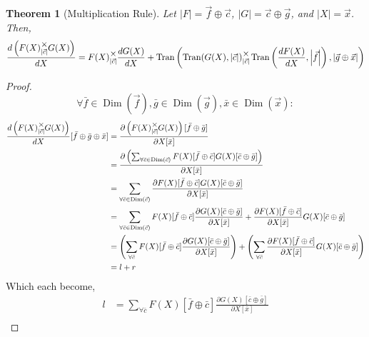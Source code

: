 \documentclass[12pt]{book}
\theoremstyle{plain}
\newtheorem{theorem}{Theorem}[chapter]
\theoremstyle{definition}
\theoremstyle{ppart}
\theoremstyle{case}
\theoremstyle{solution}
\DeclareMathOperator{\Dim}{Dim}
\DeclareMathOperator{\Tran}{Tran}
\newcommand{\mmult}[1]{\text{\raisebox{1ex}{$\underset{#1}{\times}$}}}
\newcommand{\shape}[1]{\left|#1\right|}
\begin{document}
\begin{landscape}
\begin{theorem}[Multiplication Rule]
\label{multiplication_rule}
Let $\shape{F} = \vec{f} \oplus \vec{c}$, $\shape{G} = \vec{c} \oplus \vec{g}$,
and $\shape{X} = \vec{x}$. Then,
\begin{align*}
 \frac{d\left(F(X) \mmult{\shape{\vec{c}}} G(X)\right)}{dX} =
 F(X) \mmult{\shape{\vec{c}}} \frac{dG(X)}{dX} +
 \Tran\left(
   \Tran(G(X), \shape{\vec{c}})
     \mmult{\shape{\vec{c}}}
   \Tran\left(\frac{dF(X)}{dX}, \shape{\vec{f}}\right),
   \shape{\vec{g} \oplus \vec{x}}
 \right)
\end{align*}
\end{theorem}
\begin{proof}
\[
 \forall
  \bar{f} \in \Dim(\vec{f}),
  \bar{g} \in \Dim(\vec{g}),
  \bar{x} \in \Dim(\vec{x})
 :
\]
\begin{align*}
 \frac{d\left(F(X) \mmult{\shape{\vec{c}}} G(X)\right)}{dX}
  [\bar{f} \oplus \bar{g} \oplus \bar{x}]
 &= \frac{
       \partial \left(F(X) \mmult{\shape{\vec{c}}} G(X)\right)[\bar{f} \oplus \bar{g}]
    }{
       \partial X[\bar{x}]
    } \\
 &= \frac{
       \partial \left(
        \sum_{\forall \bar{c} \in \Dim(\vec{c})}
         F(X)[\bar{f} \oplus \bar{c}] G(X)[\bar{c} \oplus \bar{g}]
      \right)
    }{
       \partial X[\bar{x}]
    } \\
 &= \sum_{\forall \bar{c} \in \Dim(\vec{c})}
    \frac{
      \partial F(X)[\bar{f} \oplus \bar{c}] G(X)[\bar{c} \oplus \bar{g}]
    }{
      \partial X[\bar{x}]
    }\\
 &= \sum_{\forall \bar{c} \in \Dim(\vec{c})}
    F(X)[\bar{f} \oplus \bar{c}]
    \frac{\partial G(X)[\bar{c} \oplus \bar{g}]}{\partial X[\bar{x}]}
    +
    \frac{\partial F(X)[\bar{f} \oplus \bar{c}]}{\partial X[\bar{x}]}
    G(X)[\bar{c} \oplus \bar{g}] \\
 &=
   \left(
    \sum_{\forall \bar{c}}
      F(X)[\bar{f} \oplus \bar{c}]
      \frac{\partial G(X)[\bar{c} \oplus \bar{g}]}{\partial X[\bar{x}]}
   \right)
   +
   \left(
    \sum_{\forall \bar{c}}
      \frac{\partial F(X)[\bar{f} \oplus \bar{c}]}{\partial X[\bar{x}]}
      G(X)[\bar{c} \oplus \bar{g}]
   \right) \\
 &=
    l + r
\end{align*}
Which each become,
\begin{align*}
 l
 &=
  \sum_{\forall \bar{c}}
    F(X)[\bar{f} \oplus \bar{c}]
    \frac{\partial G(X)[\bar{c} \oplus \bar{g}]}{\partial X[\bar{x}]} \\

\end{align*}
\end{proof}
\end{landscape}
\end{document}
